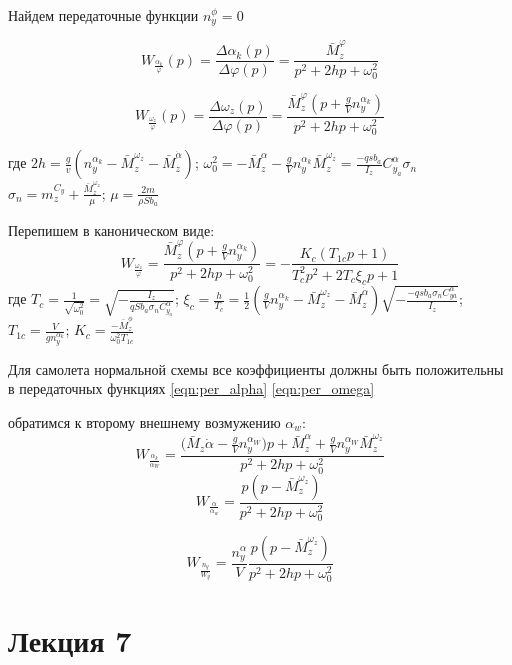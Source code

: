 \documentclass{article}
\begin{document}
Найдем передаточные функции $n_y^\phi= 0$

\begin{equation}\label{eqn:per_alpha}
	W_{\frac{\alpha_k}{\varphi}}(p) = \frac{\Delta \alpha_k(p)}{\Delta \varphi(p)} = \frac{\bar{M}_z^\varphi}{p^2 + 2hp + \omega_0^2}
\end{equation}

\[
	W_{\frac{\omega_z}{\varphi}} (p) = \frac{\Delta \omega_z(p)}{\Delta \varphi(p)} =\frac{\bar{M}_z^\varphi(p + \frac{g}{V} n_y^{\alpha_k})}{p^2 + 2hp + \omega_0^{2}}
\]

где $2h = \frac{g}{v}(n_y^{\alpha_k} - \bar{M}_z^{\omega_z} - \bar{M}_z^{\dot{\alpha}})$; $\omega_0^2 = - \bar{M}_z^{\alpha} - \frac{g}{V} n_y^{\alpha_k} \bar{M}_z^{\omega_z} = \frac{-qsb_a}{I_z} C_{y_a}^{\alpha} \sigma_{n}$\\
$\sigma_n = m_z^{C_y} + \frac{\bar{M}_z^{\omega_z}}{\mu}$; $\mu = \frac{2 m}{\rho S b_a}$

Перепишем в каноническом виде:
\begin{equation}\label{eqn:per_omega}
	W_{\frac{\omega_z}{\varphi}} = \frac{\bar{M}_z^\varphi(p + \frac{g}{V} n_y^{\alpha_k})} {p^2 + 2hp + \omega_0^2}= %
	-\frac{K_c (T_{1c} p + 1)}{T^2_c p^2 + 2 T_c \xi_c p + 1}
\end{equation}
где $T_c = \frac{1}{\sqrt{\omega_0^2}} = \sqrt{-\frac{I_z}{q S b _a \sigma_n C_{y_a}^{\alpha}}}$; $\xi_c = \frac{h}{T_c} = \frac{1}{2}( \frac{g}{V} n_y^{\alpha_k} - \bar{M}_z^{\omega_z} - \bar{M}_z^{\dot{\alpha}}) \sqrt{-\frac{-q s b_a \sigma_n C_{ya}^{\alpha}}{I_z}}$; $T_{1c} = \frac{V}{g n_y^{\alpha_k}}$; $K_c = \frac{-\bar{M}_z^\phi}{\omega_0^2 T_{1c}}$

Для самолета нормальной схемы все коэффициенты должны быть положительны в передаточных функциях \eqref{eqn:per_alpha} \eqref{eqn:per_omega}

обратимся к второму внешнему возмужению $\alpha_w$:
\[
	W_{\frac{\alpha_k}{\alpha_W}} = \frac{(\bar{M}_z {\dot{\alpha} - \frac{g}{V} n_y^{\alpha_W}) p + \bar{M}_z^\alpha + \frac{g}{V} n_y^{\alpha_W} \bar{M}_z^{\omega_z} }}{p^2 + 2hp + \omega_0^2}
\]
\[
	W_{\frac{\alpha}{\alpha_w}} = \frac{p(p - \bar{M}_z^{\omega_z})}{p^2 + 2hp+ \omega_0^2}
\]

\[
	W_{\frac{n_y}{W_y}} = \frac{n_y^\alpha}{V} \frac{p(p - \bar{M}_z^{\omega_z})}{p^2 + 2hp + \omega_0^2}
\]
\newpage

\section{Лекция 7}
\end{document}
